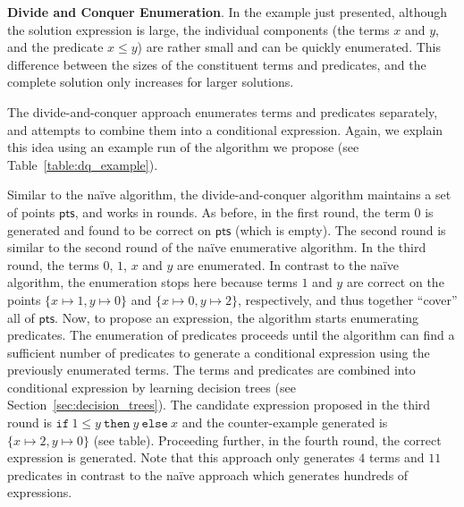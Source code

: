 \documentclass{llncs}
\newcommand\Points{\mathsf{pts}}
\newcommand\ITE[3]{\mathtt{if}~#1~\mathtt{then}~#2~\mathtt{else}~#3}
\renewcommand{\paragraph}[1]{\par\noindent\textbf{#1}.}
\begin{document}
\paragraph{Divide and Conquer Enumeration}
In the example just presented, although the solution expression is large, the
individual components (the terms $x$ and $y$, and the predicate $x \leq
y$) are rather small and can be quickly enumerated.
This difference between the sizes of the constituent terms and
predicates, and the complete solution only increases for larger
solutions.

The divide-and-conquer approach enumerates terms and predicates
separately, and attempts to combine them into a conditional expression.
Again, we explain this idea using an example run of the algorithm we
propose (see Table~\ref{table:dq_example}).

Similar to the na\"ive algorithm, the divide-and-conquer algorithm
maintains a set of points $\Points$, and works in rounds.
As before, in the first round, the term $0$ is generated and found to be
correct on $\Points$ (which is empty).
The second round is similar to the second round of the na\"ive
enumerative algorithm.
In the third round, the terms $0$, $1$, $x$ and $y$ are enumerated.
In contrast to the na\"ive algorithm, the enumeration stops here because
terms $1$ and $y$ are correct on the points $\{ x \mapsto 1, y \mapsto 0
\}$ and $\{ x \mapsto 0, y \mapsto 2 \}$, respectively, and thus
together ``cover'' all of $\Points$.
Now, to propose an expression, the algorithm starts enumerating
predicates.
The enumeration of predicates proceeds until the algorithm can find
a sufficient number of predicates to generate a conditional expression
using the previously enumerated terms.
The terms and predicates are combined into conditional expression by
learning decision trees (see Section~\ref{sec:decision_trees}).
The candidate expression proposed in the third round is
$\ITE{1 \leq y}{y}{x}$ and the counter-example generated is
$\{ x \mapsto 2, y \mapsto 0 \}$ (see table).
Proceeding further, in the fourth round, the correct expression is
generated.
Note that this approach only generates $4$ terms and $11$ predicates in
contrast to the na\"ive approach which generates hundreds of
expressions.
\end{document}
